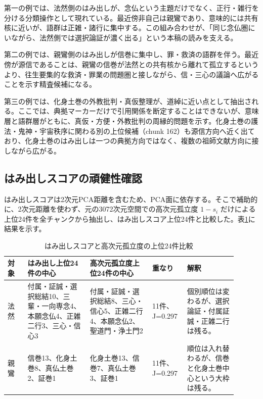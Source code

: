 \documentclass[uplatex,dvipdfmx,11pt,a4paper]{jsarticle}
\begin{document}
第一の例では、法然側のはみ出しが、念仏という主題だけでなく、正行・雑行を分ける分類操作として現れている。最近傍非自己は親鸞であり、意味的には共有核に近いが、語群は正雑・諸行に集中する。この組み合わせが、「同じ念仏圏にいながら、法然側では選択論証が濃く出る」という本稿の読みを支える。

第二の例では、親鸞側のはみ出しが信巻に集中し、罪・救済の語群を伴う。最近傍が源信であることは、親鸞の信巻が法然との共有核から離れて孤立するというより、往生要集的な救済・罪業の問題圏と接しながら、信・三心の議論へ広がることを示す精査候補になる。

第三の例では、化身土巻の外教批判・真仮整理が、道綽に近い点として抽出される。ここでは、典拠マーカーだけで引用関係を断定することはできないが、意味層と語群層がともに、真仮・方便・外教批判の周縁的問題を示す。化身土巻の護法・鬼神・宇宙秩序に関わる別の上位候補（chunk 162）も源信方向へ近く出ており、化身土巻のはみ出しは一つの典拠方向ではなく、複数の祖師文献方向に接しながら広がる。

\subsection{はみ出しスコアの頑健性確認}

はみ出しスコアは2次元PCA距離を含むため、PCA面に依存する。そこで補助的に、2次元距離を使わず、元の3072次元空間での高次元孤立度 \(1-s_i\) だけによる上位24件を全チャンクから抽出し、はみ出しスコア上位24件と比較した。表\ref{tab:high-dim-isolation-check}に結果を示す。

\begin{table}[H]
\centering
\footnotesize
\setlength{\tabcolsep}{2pt}
\caption{はみ出しスコアと高次元孤立度の上位24件比較}
\label{tab:high-dim-isolation-check}
\begin{tabular}{@{}p{0.08\linewidth}p{0.25\linewidth}p{0.25\linewidth}p{0.12\linewidth}p{0.20\linewidth}@{}}
\toprule
対象 & はみ出し上位24件の中心 & 高次元孤立度上位24件の中心 & 重なり & 解釈 \\
\midrule
法然 & 付属・証誠・選択総結10、三輩・一向専念4、本願念仏4、正雑二行3、三心・信心3 & 付属・証誠・選択総結8、三心・信心5、正雑二行4、本願念仏2、聖道門・浄土門2 & 11件、J=0.297 & 個別順位は変わるが、選択論証・付属証誠・正雑二行は残る。 \\
親鸞 & 信巻13、化身土巻8、真仏土巻2、証巻1 & 化身土巻13、信巻7、真仏土巻3、証巻1 & 11件、J=0.297 & 順位は入れ替わるが、信巻と化身土巻中心という大枠は残る。 \\
\bottomrule
\end{tabular}
\end{table}
\end{document}
